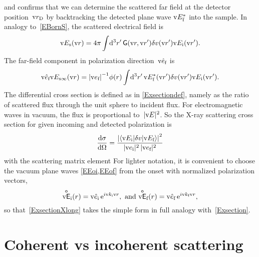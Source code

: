 and confirms that we can determine the scattered far field at the detector position~$\text{v}{r}_\text{D}$
by backtracking the detected plane wave $\text{v}{E}_{\text{f}}^*$ into the sample.
In analogy to~\cref{EBornS}, the scattered electrical field is
\begin{equation}\label{EBornX}
  \text{v}{E}_{\text{s}}(\text{v}{r})
  = 4\pi\int\!\mathrm d^3r'\, \mathsf{G}(\text{v}{r},\text{v}{r}')\delta v(\text{v}{r}')\text{v}{E}_{\text{i}}(\text{v}{r}').
\end{equation}
The far-field component in polarization direction~$\text{v}{\hat e}_{\text{f}}$ is
\begin{equation}
  \text{v}{\hat e}_{\text{f}}\text{v}{E}_{\text{s}\infty}(\text{v}{r})
  = {|\text{v}{e}_{\text{f}}|}^{-1}\phi(r) \int\!\mathrm d^3r'\, \text{v}{E}_{\text{f}}^*(\text{v}{r}')\delta v(\text{v}{r}')\text{v}{E}_{\text{i}}(\text{v}{r}').
\end{equation}
The differential cross section
is defined as in \cref{Exsectiondef},
namely as the ratio of scattered flux through the unit sphere to incident flux.
For electromagnetic waves in vacuum, the flux is proportional to~$|\text{v}{E}|^2$.
So the X-ray scattering cross section for given incoming and detected polarization is
\begin{equation}\label{ExsectionXlong}
  \frac{\mathrm d\sigma}{\mathrm d\Omega}
  =  \frac{ {\left|\left\langle\text{v}{E}_{\text{i}}|\delta v|\text{v}{E}_{\text{f}}\right\rangle\right|}^2 }{|\text{v}{e}_{\text{i}}|^2\,|\text{v}{e}_{\text{f}}|^2}
\end{equation}
with the scattering matrix element
%
For lighter notation,
it is convenient to choose the vacuum plane waves \cref{EEoi,EEof} from the onset
with normalized polarization vectors,
\begin{equation}
  \mathsf{\overset{o}{\text{v}{E}}}_{\text{i}}(r) = \text{v}{\hat e}_{\text{i}}\, \mathrm e^{i\text{v}{k}_{\text{i}}\text{v}{r}}, \text{~and~}
  \mathsf{\overset{o}{\text{v}{E}}}_{\text{f}}(r) = \text{v}{\hat e}_{\text{f}}\, \mathrm e^{i\text{v}{k}_{\text{f}}\text{v}{r}},
\end{equation}
so that~\cref{ExsectionXlong}
takes the simple form
in full analogy with~\cref{Exsection}.
%

\section{Coherent vs incoherent scattering}\label{Scoherlen}

